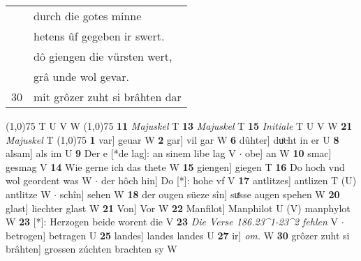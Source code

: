 \documentclass[8pt,a4paper,notitlepage]{article}
\begin{document}
\begin{table}[ht]
\begin{minipage}[t]{0.5\linewidth}
\begin{tabular}{rl}
 & durch die gotes minne\\ 
 & hetens ûf gegeben ir swert.\\ 
 & dô giengen die vürsten wert,\\ 
 & grâ unde wol gevar.\\ 
30 & mit grôzer zuht si brâhten dar\\ 
\end{tabular}
\scriptsize
\line(1,0){75} \newline
T U V W \newline
\line(1,0){75} \newline
\textbf{11} \textit{Majuskel} T  \textbf{13} \textit{Majuskel} T  \textbf{15} \textit{Initiale} T U V W  \textbf{21} \textit{Majuskel} T  \newline
\line(1,0){75} \newline
\textbf{1} var] geuar W \textbf{2} gar] vil gar W \textbf{6} dûhter] duͦcht in er U \textbf{8} alsam] als im U \textbf{9} Der e [*de lag]: an sinem libe lag V  $\cdot$ obe] an W \textbf{10} smac] gesmag V \textbf{14} Wie gerne ich das thete W \textbf{15} giengen] giegen T \textbf{16} Do hoch vnd wol geordent was W  $\cdot$ der hôch hin] Do [*]: hohe vf V \textbf{17} antlitzes] antlizen T (U) antlitze W  $\cdot$ schîn] sehen W \textbf{18} der ougen süeze sîn] suͤsse augen spehen W \textbf{20} glast] liechter glast W \textbf{21} Von] Vor W \textbf{22} Manfilot] Manphilot U (V) manphylot W \textbf{23} [*]: Herzogen beide worent die V \textbf{23} \textit{Die Verse 186.23\textasciicircum1-23\textasciicircum2 fehlen} V   $\cdot$ betrogen] betragen U \textbf{25} landes] landes landes U \textbf{27} ir] \textit{om.} W \textbf{30} grôzer zuht si brâhten] grossen zúchten brachten sy W \newline
\end{minipage}
\end{table}
\end{document}
